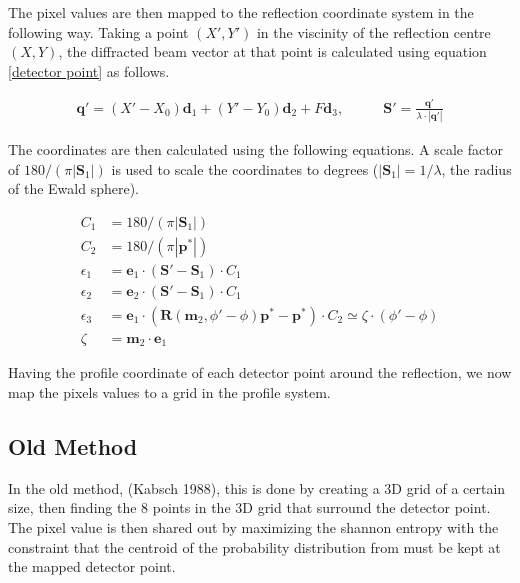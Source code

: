 \documentclass[a4paper,10pt]{article}
\begin{document}
The pixel values are then mapped to the reflection coordinate system in the
following way. Taking a point $(X', Y')$ in the viscinity of the reflection
centre $(X, Y)$, the diffracted beam vector at that point is calculated using
equation \eqref{detector point} as follows.

\begin{equation}
  \begin{aligned}
    \bm{q}' = (X' - X_0) \bm{d}_1 + (Y' - Y_0) \bm{d}_2 + F \bm{d}_3, &\qquad
    \bm{S}' = \frac{\bm{q}'}{\lambda \cdot |\bm{q}'|}
  \end{aligned}
  \nonumber
\end{equation}

The coordinates are then calculated using the following equations. A scale
factor of $180 / (\pi |\bm{S}_1|)$ is used to scale the coordinates to degrees
($|\bm{S}_1| = 1 / \lambda$, the radius of the Ewald sphere).

\begin{equation}
  \begin{aligned}
    C_1        &= 180 / (\pi |\bm{S}_1|)\\
    C_2        &= 180 / (\pi |\bm{p}^*|)\\
    \epsilon_1 &= \bm{e}_1 \cdot (\bm{S}' - \bm{S}_1) \cdot C_1 \\
    \epsilon_2 &= \bm{e}_2 \cdot (\bm{S}' - \bm{S}_1) \cdot C_1\\
    \epsilon_3 &= \bm{e}_1 \cdot (\bm{R}(\bm{m}_2, \phi' - \phi) \bm{p}^* - 
                  \bm{p}^*) \cdot C_2 \simeq \zeta \cdot (\phi' - \phi) \\
    \zeta      &= \bm{m}_2 \cdot \bm{e}_1
  \end{aligned}
\end{equation}

Having the profile coordinate of each detector point around the reflection, we
now map the pixels values to a grid in the profile system. 

\subsection{Old Method}

In the old method, (Kabsch 1988), this is done by creating a 3D grid of a 
certain size, then finding the 8 points in the 3D grid that surround the 
detector point. The pixel value is then shared out by maximizing the shannon 
entropy with the constraint that the centroid of the probability distribution 
from must be kept at the mapped detector point.
\end{document}
